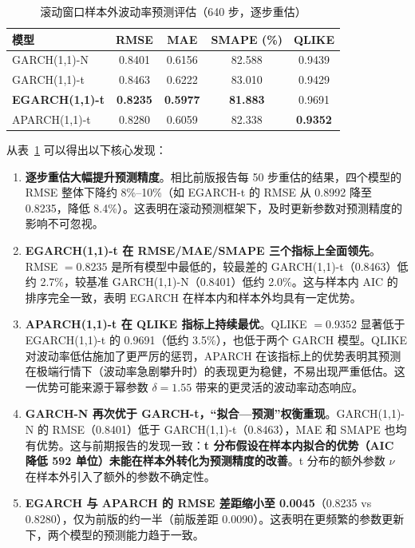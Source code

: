 \documentclass[12pt,a4paper]{article}
\begin{document}
\begin{table}[H]
\centering
\caption{滚动窗口样本外波动率预测评估（640 步，逐步重估）}
\label{tab:forecast}
\begin{tabular}{l c c c c}
\toprule
模型 & RMSE & MAE & SMAPE (\%) & QLIKE \\
\midrule
GARCH(1,1)-N  & 0.8401 & 0.6156 & 82.588 & 0.9439 \\
GARCH(1,1)-t  & 0.8463 & 0.6222 & 83.010 & 0.9429 \\
\textbf{EGARCH(1,1)-t} & \textbf{0.8235} & \textbf{0.5977} & \textbf{81.883} & 0.9691 \\
APARCH(1,1)-t & 0.8280 & 0.6059 & 82.338 & \textbf{0.9352} \\
\bottomrule
\end{tabular}
\end{table}

从表~\ref{tab:forecast} 可以得出以下核心发现：

\begin{enumerate}[nosep,label=(\arabic*)]
    \item \textbf{逐步重估大幅提升预测精度}。相比前版报告每 50 步重估的结果，四个模型的 RMSE 整体下降约 8\%--10\%（如 EGARCH-t 的 RMSE 从 0.8992 降至 0.8235，降低 8.4\%）。这表明在滚动预测框架下，及时更新参数对预测精度的影响不可忽视。

    \item \textbf{EGARCH(1,1)-t 在 RMSE/MAE/SMAPE 三个指标上全面领先}。RMSE $=0.8235$ 是所有模型中最低的，较最差的 GARCH(1,1)-t（0.8463）低约 2.7\%，较基准 GARCH(1,1)-N（0.8401）低约 2.0\%。这与样本内 AIC 的排序完全一致，表明 EGARCH 在样本内和样本外均具有一定优势。

    \item \textbf{APARCH(1,1)-t 在 QLIKE 指标上持续最优}。QLIKE $=0.9352$ 显著低于 
    EGARCH(1,1)-t 的 0.9691（低约 3.5\%），也低于两个 GARCH 模型。QLIKE 对波动率低估施加了更严厉的惩罚，APARCH 在该指标上的优势表明其预测在极端行情下（波动率急剧攀升时）的表现更为稳健，不易出现严重低估。这一优势可能来源于幂参数 $\delta = 1.55$ 带来的更灵活的波动率动态响应。

    \item \textbf{GARCH-N 再次优于 GARCH-t，``拟合—预测''权衡重现}。GARCH(1,1)-N 的 RMSE（0.8401）低于 GARCH(1,1)-t（0.8463），MAE 和 SMAPE 也均有优势。这与前期报告的发现一致：\textbf{t 分布假设在样本内拟合的优势（AIC 降低 592 单位）未能在样本外转化为预测精度的改善}。t 分布的额外参数 $\nu$ 在样本外引入了额外的参数不确定性。

    \item \textbf{EGARCH 与 APARCH 的 RMSE 差距缩小至 0.0045}（0.8235 vs 0.8280），仅为前版的约一半（前版差距 0.0090）。这表明在更频繁的参数更新下，两个模型的预测能力趋于一致。
\end{enumerate}
\end{document}
